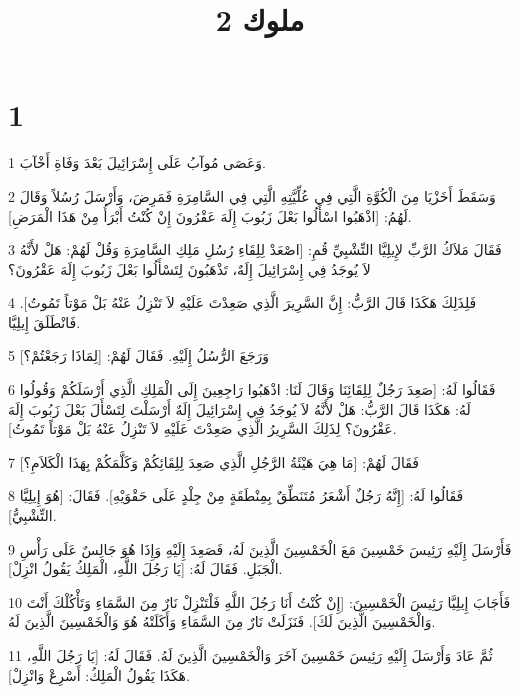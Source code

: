 

\title{2 ملوك}


\chapter{1}

\par 1 وَعَصَى مُوآبُ عَلَى إِسْرَائِيلَ بَعْدَ وَفَاةِ أَخْآبَ.
\par 2 وَسَقَطَ أَخَزْيَا مِنَ الْكُوَّةِ الَّتِي فِي عُلِّيَّتِهِ الَّتِي فِي السَّامِرَةِ فَمَرِضَ، وَأَرْسَلَ رُسُلاً وَقَالَ لَهُمُ: [اذْهَبُوا اسْأَلُوا بَعْلَ زَبُوبَ إِلَهَ عَقْرُونَ إِنْ كُنْتُ أَبْرَأُ مِنْ هَذَا الْمَرَضِ].
\par 3 فَقَالَ مَلاَكُ الرَّبِّ لإِيلِيَّا التِّشْبِيِّ قُمِ: [اصْعَدْ لِلِقَاءِ رُسُلِ مَلِكِ السَّامِرَةِ وَقُلْ لَهُمْ: هَلْ لأَنَّهُ لاَ يُوجَدُ فِي إِسْرَائِيلَ إِلَهٌ، تَذْهَبُونَ لِتَسْأَلُوا بَعْلَ زَبُوبَ إِلَهَ عَقْرُونَ؟
\par 4 فَلِذَلِكَ هَكَذَا قَالَ الرَّبُّ: إِنَّ السَّرِيرَ الَّذِي صَعِدْتَ عَلَيْهِ لاَ تَنْزِلُ عَنْهُ بَلْ مَوْتاً تَمُوتُ]. فَانْطَلَقَ إِيلِيَّا.
\par 5 وَرَجَعَ الرُّسُلُ إِلَيْهِ. فَقَالَ لَهُمْ: [لِمَاذَا رَجَعْتُمْ؟]
\par 6 فَقَالُوا لَهُ: [صَعِدَ رَجُلٌ لِلِقَائِنَا وَقَالَ لَنَا: اذْهَبُوا رَاجِعِينَ إِلَى الْمَلِكِ الَّذِي أَرْسَلَكُمْ وَقُولُوا لَهُ: هَكَذَا قَالَ الرَّبُّ: هَلْ لأَنَّهُ لاَ يُوجَدُ فِي إِسْرَائِيلَ إِلَهٌ أَرْسَلْتَ لِتَسْأَلَ بَعْلَ زَبُوبَ إِلَهَ عَقْرُونَ؟ لِذَلِكَ السَّرِيرُ الَّذِي صَعِدْتَ عَلَيْهِ لاَ تَنْزِلُ عَنْهُ بَلْ مَوْتاً تَمُوتُ].
\par 7 فَقَالَ لَهُمْ: [مَا هِيَ هَيْئَةُ الرَّجُلِ الَّذِي صَعِدَ لِلِقَائِكُمْ وَكَلَّمَكُمْ بِهَذَا الْكَلاَمِ؟]
\par 8 فَقَالُوا لَهُ: [إِنَّهُ رَجُلٌ أَشْعَرُ مُتَنَطِّقٌ بِمِنْطَقَةٍ مِنْ جِلْدٍ عَلَى حَقْوَيْهِ]. فَقَالَ: [هُوَ إِيلِيَّا التِّشْبِيُّ].
\par 9 فَأَرْسَلَ إِلَيْهِ رَئِيسَ خَمْسِينَ مَعَ الْخَمْسِينَ الَّذِينَ لَهُ، فَصَعِدَ إِلَيْهِ وَإِذَا هُوَ جَالِسٌ عَلَى رَأْسِ الْجَبَلِ. فَقَالَ لَهُ: [يَا رَجُلَ اللَّهِ، الْمَلِكُ يَقُولُ انْزِلْ].
\par 10 فَأَجَابَ إِيلِيَّا رَئِيسَ الْخَمْسِينَ: [إِنْ كُنْتُ أَنَا رَجُلَ اللَّهِ فَلْتَنْزِلْ نَارٌ مِنَ السَّمَاءِ وَتَأْكُلْكَ أَنْتَ وَالْخَمْسِينَ الَّذِينَ لَكَ]. فَنَزَلَتْ نَارٌ مِنَ السَّمَاءِ وَأَكَلَتْهُ هُوَ وَالْخَمْسِينَ الَّذِينَ لَهُ.
\par 11 ثُمَّ عَادَ وَأَرْسَلَ إِلَيْهِ رَئِيسَ خَمْسِينَ آخَرَ وَالْخَمْسِينَ الَّذِينَ لَهُ. فَقَالَ لَهُ: [يَا رَجُلَ اللَّهِ، هَكَذَا يَقُولُ الْمَلِكُ: أَسْرِعْ وَانْزِلْ].
